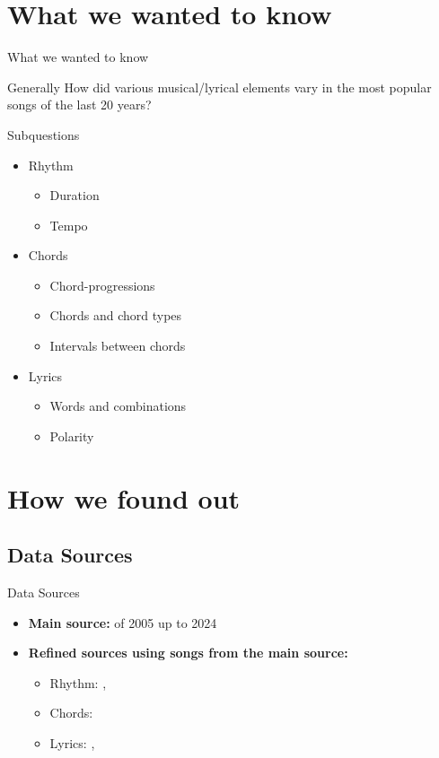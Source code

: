 \section{What we wanted to know}
\begin{frame}[allowframebreaks]{What we wanted to know}
    \begin{block}{Generally}
    How did various musical/lyrical elements vary in the most popular songs of the last 20 years?
    \end{block}

    \framebreak

    \begin{block}{Subquestions}
    \onehalfspacing
    \begin{itemize}
        \item Rhythm \begin{itemize}
                \item Duration
                \item Tempo
            \end{itemize}
        \item Chords \begin{itemize}
                \item Chord-progressions
                \item Chords and chord types
                \item Intervals between chords
            \end{itemize}
        \item Lyrics \begin{itemize}
                \item Words and combinations
                \item Polarity
            \end{itemize}
    \end{itemize}
    \end{block}
\end{frame}

\section{How we found out}
\subsection{Data Sources}
\begin{frame}{Data Sources}
    \begin{itemize}
        \item \textbf{Main source:} \textcite{bill} of 2005 up to 2024
        \item \textbf{Refined sources using songs from the main source:}
            \begin{itemize}
                \item Rhythm: \textcite{spot}, \textcite{sbpm}
                \item Chords: \textcite{ug}
                \item Lyrics: \textcite{lastfm}, \textcite{lyr}
                
            \end{itemize}
        \end{itemize}
\end{frame}
